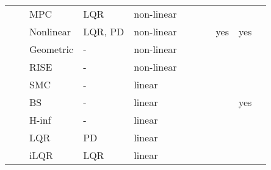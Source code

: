 \begin{landscape}
\begin{tiny}
\begin{table}[!htbp]
\begin{tabularx}{\linewidth}{@{}lllllllllll@{}}
            \citet{Trachte2015}          & \citeyear{Trachte2015}          & \gls{MPC}                  & \gls{LQR}              & non-linear           &                    &                  &                     &                    &                    &                  \\
            \citet{Liang2021}            & \citeyear{Liang2021}            & Nonlinear                  & \gls{LQR}, \gls{PD}    & non-linear           &                    &                  &                     & yes                & yes                &                  \\
            \citet{Zeng2019a}            & \citeyear{Zeng2019a}            & Geometric                  & -                      & non-linear           &                    &                  &                     &                    &                    &                  \\
            \citet{Yang2018}             & \citeyear{Yang2018}             & \gls{RISE}                 & -                      & non-linear           &                    &                  &                     &                    &                    &                  \\
            \citet{Martinez-Vasquez2020} & \citeyear{Martinez-Vasquez2020} & \gls{SMC}                  & -                      & linear               &                    &                  &                     &                    &                    &                  \\
            \citet{Mosco-Luciano2020}    & \citeyear{Mosco-Luciano2020}    & \gls{BS}                   & -                      & linear               &                    &                  &                     &                    & yes                &                  \\
            \citet{Rigatos2018}          & \citeyear{Rigatos2018}          & \gls{H-inf}                & -                      & linear               &                    &                  &                     &                    &                    &                  \\
            \citet{Alothman2015}         & \citeyear{Alothman2015}         & \gls{LQR}                  & \gls{PD}               & linear               &                    &                  &                     &                    &                    &                  \\
            \citet{Alothman2016}         & \citeyear{Alothman2016}         & \gls{iLQR}                 & \gls{LQR}              & linear               &                    &                  &                     &                    &                    &                  \\
        \bottomrule
    \end{tabularx}
    \label{tbl:lit}
\end{table}


\end{tiny}
\end{landscape}
